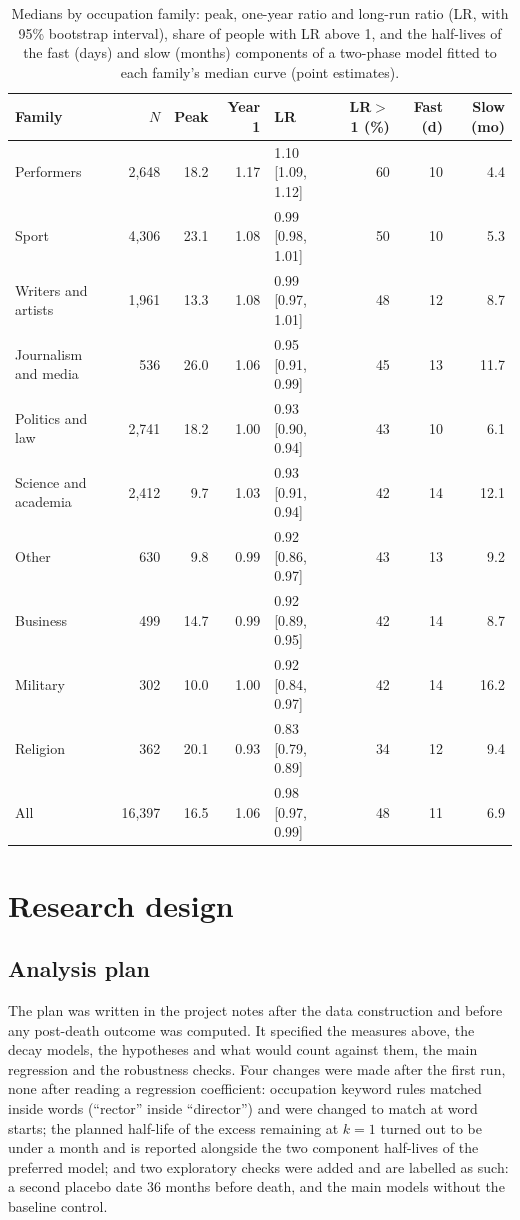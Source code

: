 \documentclass[11pt,a4paper]{article}
\begin{document}
\begin{table}[tbp]\centering\small\caption{Medians by occupation family: peak, one-year ratio and long-run ratio (LR, with 95\% bootstrap interval), share of people with LR above 1, and the half-lives of the fast (days) and slow (months) components of a two-phase model fitted to each family's median curve (point estimates).}\label{tab:desc}\setlength{\tabcolsep}{4pt}\begin{tabular}{lrrrlrrr}\toprule Family & $N$ & Peak & Year 1 & LR & LR$>$1 (\%) & Fast (d) & Slow (mo)\\\midrule
Performers & 2,648 & 18.2 & 1.17 & 1.10 [1.09, 1.12] & 60 & 10 & 4.4\\
Sport & 4,306 & 23.1 & 1.08 & 0.99 [0.98, 1.01] & 50 & 10 & 5.3\\
Writers and artists & 1,961 & 13.3 & 1.08 & 0.99 [0.97, 1.01] & 48 & 12 & 8.7\\
Journalism and media & 536 & 26.0 & 1.06 & 0.95 [0.91, 0.99] & 45 & 13 & 11.7\\
Politics and law & 2,741 & 18.2 & 1.00 & 0.93 [0.90, 0.94] & 43 & 10 & 6.1\\
Science and academia & 2,412 & 9.7 & 1.03 & 0.93 [0.91, 0.94] & 42 & 14 & 12.1\\
Other & 630 & 9.8 & 0.99 & 0.92 [0.86, 0.97] & 43 & 13 & 9.2\\
Business & 499 & 14.7 & 0.99 & 0.92 [0.89, 0.95] & 42 & 14 & 8.7\\
Military & 302 & 10.0 & 1.00 & 0.92 [0.84, 0.97] & 42 & 14 & 16.2\\
Religion & 362 & 20.1 & 0.93 & 0.83 [0.79, 0.89] & 34 & 12 & 9.4\\
\midrule All & 16,397 & 16.5 & 1.06 & 0.98 [0.97, 0.99] & 48 & 11 & 6.9\\
\bottomrule\end{tabular}\end{table}

\section{Research design}\label{sec:design}
\subsection{Analysis plan}
The plan was written in the project notes after the data construction and before any post-death outcome was computed. It specified the measures above, the decay models, the hypotheses and what would count against them, the main regression and the robustness checks. Four changes were made after the first run, none after reading a regression coefficient: occupation keyword rules matched inside words (``rector'' inside ``director'') and were changed to match at word starts; the planned half-life of the excess remaining at $k = 1$ turned out to be under a month and is reported alongside the two component half-lives of the preferred model; and two exploratory checks were added and are labelled as such: a second placebo date 36 months before death, and the main models without the baseline control.
\end{document}
